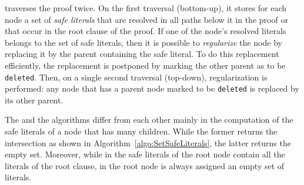 \documentclass{llncs}
\begin{document}
{\RPI} traverses the proof twice. On the first traversal (bottom-up), it stores for each node a set of \emph{safe literals} that are resolved in all paths below it in the proof or that occur in the root clause of the proof. If one of the node's resolved literals belongs to the set of safe literals, then it is possible to \emph{regularize} the node by replacing it by the parent containing the safe literal. To do this replacement efficiently, the replacement is postponed by marking the other parent as to be \texttt{deleted}. Then, on a single second traversal (top-down), regularization is performed: any node that has a parent node marked to be \texttt{deleted} is replaced by its other parent.

The {\RPI} and the {\RP} algorithms differ from each other mainly in the
computation of the safe literals of a node that has many children. While the former 
returns the intersection as shown in Algorithm~\ref{algo:SetSafeLiterals}, the latter
returns the empty set. 
Moreover, while in {\RPI} the safe literals of the root node contain all the literals of the root clause, in {\RP} the root node is always assigned an empty set of literals. 










\begin{footnotesize}
%


\end{footnotesize}
\appendix

\end{document}
